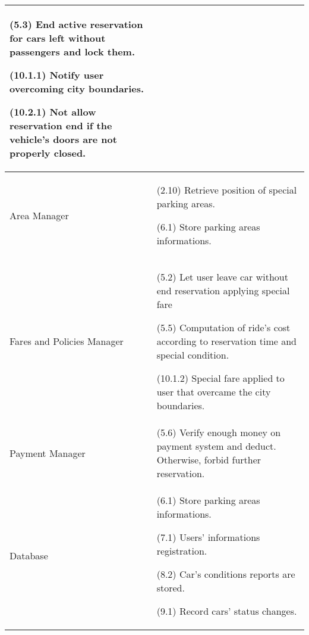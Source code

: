 \begin{longtable}{ |l|p{10cm}| }
(5.3) End active reservation for cars left without passengers and lock them.

(10.1.1) Notify user overcoming city boundaries.

(10.2.1) Not allow reservation end if the vehicle's doors are not properly closed.
\\ \hline

	Area Manager & (2.10) Retrieve position of special parking areas.

(6.1) Store parking areas informations.
\\ \hline

	Fares and Policies Manager & (5.2) Let user leave car without end reservation applying special fare

(5.5) Computation of ride's cost according to reservation time and special condition.

(10.1.2) Special fare applied to user that overcame the city boundaries.
\\ \hline

	Payment Manager & (5.6) Verify enough money on payment system and deduct. Otherwise, forbid further reservation.
\\ \hline

	Database & (6.1) Store parking areas informations.

(7.1) Users' informations registration.

(8.2) Car's conditions reports are stored.

(9.1) Record cars' status changes.
\\ \hline
\end{longtable}
